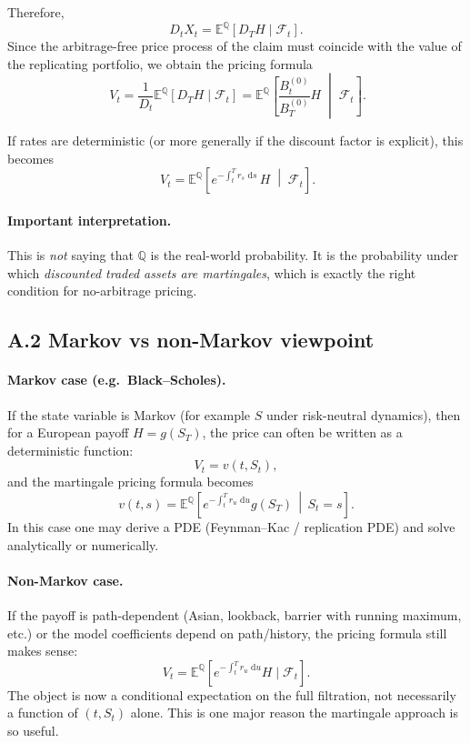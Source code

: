 \documentclass[11pt]{article}
\newcommand{\Qbb}{\mathbb{Q}}
\newcommand{\E}{\mathbb{E}}
\newcommand{\dd}{\,\mathrm{d}}
\newcommand{\1}{\mathbf{1}}
\begin{document}
Therefore,
$$
D_tX_t = \E^{\Qbb}[D_TH \mid \mathcal F_t].
$$
Since the arbitrage-free price process of the claim must coincide with the value of the replicating portfolio,
we obtain the pricing formula
$$
\boxed{
\ V_t
=
\frac{1}{D_t}\E^{\Qbb}[D_TH\mid \mathcal F_t]
=
\E^{\Qbb}\!\left[\frac{B_t^{(0)}}{B_T^{(0)}}H\;\middle|\;\mathcal F_t\right].
}
$$

If rates are deterministic (or more generally if the discount factor is explicit),
this becomes
$$
\boxed{
\ V_t
=
\E^{\Qbb}\!\left[e^{-\int_t^T r_s\,\dd s}\,H\;\middle|\;\mathcal F_t\right].
}
$$

\paragraph{Important interpretation.}
This is \emph{not} saying that \(\Qbb\) is the real-world probability.
It is the probability under which \emph{discounted traded assets are martingales},
which is exactly the right condition for no-arbitrage pricing.


\subsection*{A.2 Markov vs non-Markov viewpoint}

\paragraph{Markov case (e.g.\ Black--Scholes).}
If the state variable is Markov (for example \(S\) under risk-neutral dynamics), then for a European payoff \(H=g(S_T)\),
the price can often be written as a deterministic function:
$$
V_t = v(t,S_t),
$$
and the martingale pricing formula becomes
$$
v(t,s)=\E^{\Qbb}\!\left[e^{-\int_t^T r_u\,\dd u}g(S_T)\,\middle|\,S_t=s\right].
$$
In this case one may derive a PDE (Feynman--Kac / replication PDE) and solve analytically or numerically.

\paragraph{Non-Markov case.}
If the payoff is path-dependent (Asian, lookback, barrier with running maximum, etc.) or the model coefficients depend on path/history,
the pricing formula still makes sense:
$$
V_t=\E^{\Qbb}\!\left[e^{-\int_t^T r_u\,\dd u}H\mid \mathcal F_t\right].
$$
The object is now a conditional expectation on the full filtration, not necessarily a function of \((t,S_t)\) alone.
This is one major reason the martingale approach is so useful.
\end{document}

